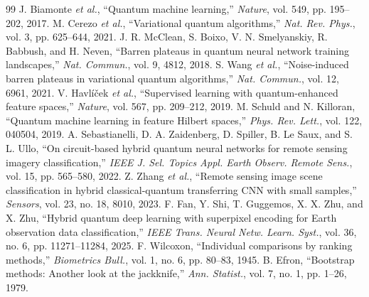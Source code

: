 \documentclass[journal]{IEEEtran}
\begin{document}
\begin{thebibliography}{99}
 J. Biamonte \emph{et al.}, ``Quantum machine learning,'' \emph{Nature}, vol. 549, pp. 195--202, 2017.
 M. Cerezo \emph{et al.}, ``Variational quantum algorithms,'' \emph{Nat. Rev. Phys.}, vol. 3, pp. 625--644, 2021.
 J. R. McClean, S. Boixo, V. N. Smelyanskiy, R. Babbush, and H. Neven, ``Barren plateaus in quantum neural network training landscapes,'' \emph{Nat. Commun.}, vol. 9, 4812, 2018.
 S. Wang \emph{et al.}, ``Noise-induced barren plateaus in variational quantum algorithms,'' \emph{Nat. Commun.}, vol. 12, 6961, 2021.
 V. Havl\'{i}\v{c}ek \emph{et al.}, ``Supervised learning with quantum-enhanced feature spaces,'' \emph{Nature}, vol. 567, pp. 209--212, 2019.
 M. Schuld and N. Killoran, ``Quantum machine learning in feature Hilbert spaces,'' \emph{Phys. Rev. Lett.}, vol. 122, 040504, 2019.
 A. Sebastianelli, D. A. Zaidenberg, D. Spiller, B. Le Saux, and S. L. Ullo, ``On circuit-based hybrid quantum neural networks for remote sensing imagery classification,'' \emph{IEEE J. Sel. Topics Appl. Earth Observ. Remote Sens.}, vol. 15, pp. 565--580, 2022.
 Z. Zhang \emph{et al.}, ``Remote sensing image scene classification in hybrid classical-quantum transferring CNN with small samples,'' \emph{Sensors}, vol. 23, no. 18, 8010, 2023.
 F. Fan, Y. Shi, T. Guggemos, X. X. Zhu, and X. Zhu, ``Hybrid quantum deep learning with superpixel encoding for Earth observation data classification,'' \emph{IEEE Trans. Neural Netw. Learn. Syst.}, vol. 36, no. 6, pp. 11271--11284, 2025.
 F. Wilcoxon, ``Individual comparisons by ranking methods,'' \emph{Biometrics Bull.}, vol. 1, no. 6, pp. 80--83, 1945.
 B. Efron, ``Bootstrap methods: Another look at the jackknife,'' \emph{Ann. Statist.}, vol. 7, no. 1, pp. 1--26, 1979.
\end{thebibliography}
\end{document}
